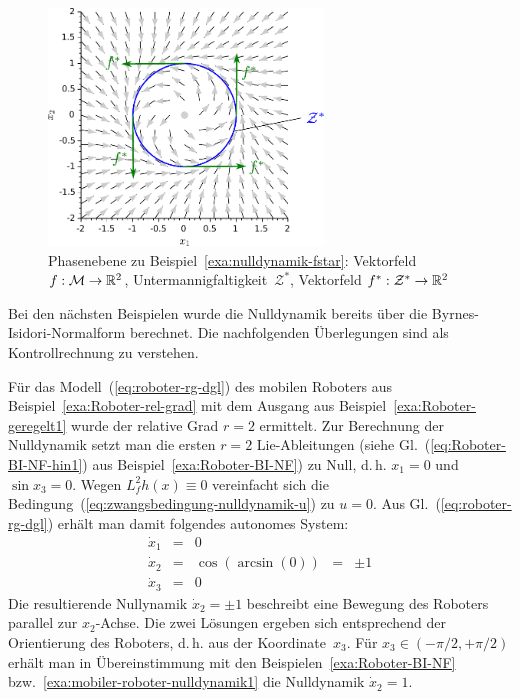 \begin{figure}
\begin{centering}
\includegraphics[width=0.65\textwidth]{nulldynamik_fstar}
\par\end{centering}
\caption{Phasen\-ebene zu Beispiel~\ref{exa:nulldynamik-fstar}: Vektorfeld
$f:\mathcal{M}\to{\mathbb{R}}^{2}$, Unter\-mannig\-faltig\-keit~$\mathcal{Z}^{*}$,
Vektor\-feld $f^{*}:\mathcal{Z}^{*}\to{\mathbb{R}}^{2}$ \label{fig:nulldynamik-fstar}}
\end{figure}

Bei den nächsten Beispielen wurde die Nulldynamik bereits über die
Byrnes-Isidori-Normalform berechnet. Die nachfolgenden Überlegungen
sind als Kontrollrechnung zu verstehen.

\begin{example}
\label{exa:mobiler-roboter-nulldynamik2}Für das Modell~(\ref{eq:roboter-rg-dgl})
des mobilen Roboters aus Beispiel~\ref{exa:Roboter-rel-grad} mit
dem Ausgang aus Beispiel~\ref{exa:Roboter-geregelt1} wurde der relative
Grad $r=2$ ermittelt. Zur Berechnung der Nulldynamik setzt man die
ersten $r=2$ Lie-Ableitungen (siehe Gl.~(\ref{eq:Roboter-BI-NF-hin1})
aus Beispiel~\ref{exa:Roboter-BI-NF}) zu Null, d.\,h. $x_{1}=0$
und $\sin x_{3}=0$. Wegen $L_{f}^{2}h(x)\equiv0$ vereinfacht sich
die Bedingung~(\ref{eq:zwangsbedingung-nulldynamik-u}) zu $u=0$.
Aus Gl.~(\ref{eq:roboter-rg-dgl}) erhält man damit folgendes autonomes
System: 
\[
\begin{array}{lclcl}
\dot{x}_{1} & = & 0\\
\dot{x}_{2} & = & \cos(\arcsin(0)) & = & \pm1\\
\dot{x}_{3} & = & 0
\end{array}
\]
Die resultierende Nullynamik $\dot{x}_{2}=\pm1$ beschreibt eine Bewegung
des Roboters parallel zur $x_{2}$-Achse. Die zwei Lösungen ergeben
sich entsprechend der Orientierung des Roboters, d.\,h. aus der Koordinate~$x_{3}$.
Für $x_{3}\in(-\pi/2,+\pi/2)$ erhält man in Übereinstimmung mit den
Beispielen~\ref{exa:Roboter-BI-NF} bzw.~\ref{exa:mobiler-roboter-nulldynamik1}
die Nulldynamik $\dot{x}_{2}=1$.
\end{example}

